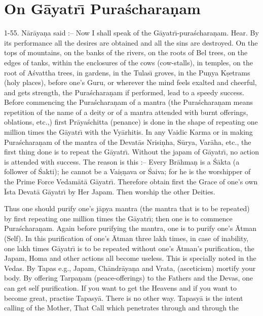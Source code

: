 \chapter{On G\=ayatr\={\i} Pura\'schara\d{n}am}

1-55. N\=ar\=aya\d{n}a said :-- Now I shall speak of the G\=ayatr\={\i}-pura\'schara\d{n}am. Hear. By its performance all the desires are obtained and all the sins are destroyed. On the tops of mountains, on the banks of the rivers, on the roots of Bel trees, on the edges of tanks, within the enclosures of the cows (cow-stalls), in temples, on the root of A\'svattha trees, in gardens, in the Tulas\={\i} groves, in the Pu\d{n}ya K\d{s}etrams (holy places), before one's Guru, or wherever the mind feels exalted and cheerful, and gets strength, the Pura\'schara\d{n}am if performed, lead to a speedy success. Before commencing the Pura\'schara\d{n}am of a mantra (the Pura\'schara\d{n}am means repetition of the name of a deity or of a mantra attended with burnt offerings, oblations, etc.,) first Pr\=aya\'schitta (penance) is done in the shape of repeating one million times the G\=ayatr\={\i} with the Vy\=arhitis. In any Vaidic Karma or in making Pura\'schara\d{n}am of the mantra of the Devat\=as Nrisi\d{n}ha, S\=urya, Var\=aha, etc., the first thing done is to repeat the G\=ayatr\={\i}. Without the japam of G\=ayatr\={\i}, no action is attended with success. The reason is this :-- Every Br\=ahma\d{n} is a \'S\=akta (a follower of \'Sakti); he cannot be a Vai\d{s}\d{n}ava or \'Saiva; for he is the worshipper of the Prime Force Vedam\=at\=a G\=ayatr\={\i}. Therefore obtain first the Grace of one's own \=Ista Devat\=a G\=ayatr\={\i} by Her Japam. Then worship the other Deities.

Thus one should purify one's j\=apya mantra (the mantra that is to be repeated) by first repeating one million times the G\=ayatr\={\i}; then one is to commence Pura\'schara\d{n}am. Again before purifying the mantra, one is to purify one's \=Atman (Self). In this purification of one's \=Atman three lakh times, in case of inability, one lakh times G\=ayatr\={\i} is to be repeated without one's \=Atman's purification, the Japam, Homa and other actions all become useless. This is specially noted in the Vedas. By Tapas e.g., Japam, Ch\=andr\=aya\d{n}a and Vrata, (asceticism) mortify your body. By offering Tarpa\d{n}am (peace-offerings) to the Fathers and the Devas, one can get self purification. If you want to get the Heavens and if you want to become great, practise Tapasy\=a. There is no other way. Tapasy\=a is the intent calling of the Mother, That Call which penetrates through and through the

